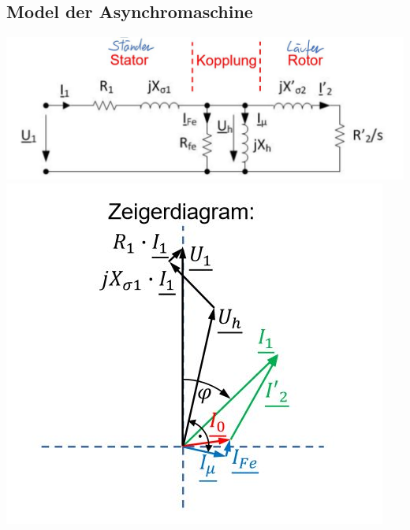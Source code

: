 \subsection{Model der Asynchromaschine}
    \includegraphics[scale = 0.6]{images/ModelASM}
    \includegraphics[scale = 0.7]{images/ModelASMZeiger}

